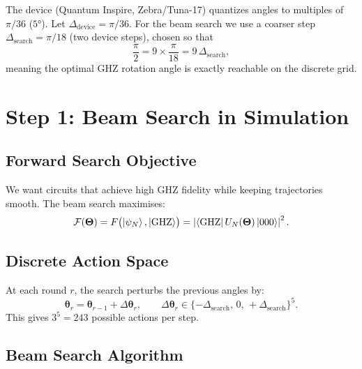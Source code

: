 \documentclass[11pt,a4paper]{article}
\begin{document}
The device (Quantum Inspire, Zebra/Tuna-17) quantizes angles to multiples of $\pi/36$ ($5°$).
Let $\Delta_{\mathrm{device}} = \pi/36$. For the beam search we use a coarser step
$\Delta_{\mathrm{search}} = \pi/18$ (two device steps), chosen so that
\begin{equation}
    \frac{\pi}{2} = 9 \times \frac{\pi}{18} = 9\,\Delta_{\mathrm{search}},
\end{equation}
meaning the optimal GHZ rotation angle is exactly reachable on the discrete grid.

\section{Step 1: Beam Search in Simulation}\label{sec:beamsearch}

\subsection{Forward Search Objective}

We want circuits that achieve high GHZ fidelity while keeping trajectories smooth.
The beam search maximises:
\begin{equation}
    \mathcal{F}(\boldsymbol{\Theta}) = F\bigl(\ket{\psi_N}, \ket{\text{GHZ}}\bigr)
    = \left|\bra{\text{GHZ}} U_N(\boldsymbol{\Theta})\ket{000}\right|^2.
\end{equation}

\subsection{Discrete Action Space}

At each round $r$, the search perturbs the previous angles by:
\begin{equation}
    \boldsymbol{\theta}_r = \boldsymbol{\theta}_{r-1} + \Delta\boldsymbol{\theta}_r,
    \qquad
    \Delta\boldsymbol{\theta}_r \in \{-\Delta_{\mathrm{search}},\, 0,\, +\Delta_{\mathrm{search}}\}^5.
\end{equation}
This gives $3^5 = 243$ possible actions per step.

\subsection{Beam Search Algorithm}
\end{document}
